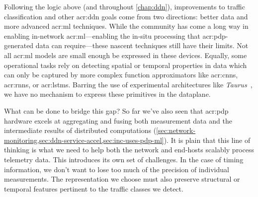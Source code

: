 Following the logic above (and throughout \cref{chap:ddn}), improvements to traffic classification and other \gls{acr:ddn} goals come from two directions: better data and more advanced \gls{acr:ml} techniques.
While the community has come a long way in enabling in-network \gls{acr:ml}---enabling the in-situ processing that \gls{acr:pdp}-generated data can require---these nascent techniques still have their limits.
Not all \gls{acr:ml} models are small enough be expressed in these devices.
Equally, some operational tasks rely on detecting spatial or temporal properties in data which can only be captured by more complex function approximators like \glspl{acr:cnn}, \glspl{acr:rnn}, or \glspl{acr:lstm}.
Barring the use of experimental architectures like \emph{Taurus}~\parencite{DBLP:conf/asplos/SwamyR0GO22}, we have no mechanism to express these primitives in the dataplane.

What can be done to bridge this gap?
So far we've also seen that \gls{acr:pdp} hardware excels at aggregating and fusing both measurement data and the intermediate results of distributed computations (\cref{sec:network-monitoring,sec:ddn-service-accel,sec:inc-uses-pdp-ml}).
It is plain that this line of thinking is what we need to help both the network and end-hosts scalably process telemetry data.
This introduces its own set of challenges.
In the case of timing information, we don't want to lose too much of the precision of individual measurements.
The representation we choose must also preserve structural or temporal features pertinent to the traffic classes we detect.

%
%


